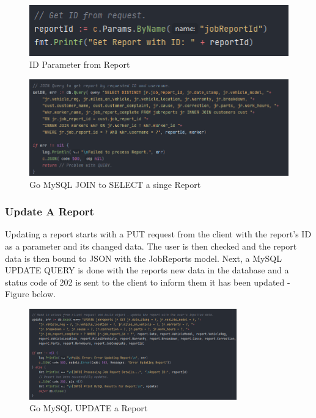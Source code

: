 \begin{figure}[H]
    \caption{ID Parameter from Report}
    \label{image:report_param_id}
    \centering
    \includegraphics[width=1.0\textwidth]{images/horton/report_system/get_report_id.png}
\end{figure}

\begin{figure}[H]
    \caption{Go MySQL JOIN to SELECT a singe Report}
    \label{image:report_by_id}
    \centering
    \includegraphics[width=1.0\textwidth]{images/horton/report_system/go_mysql_report_id.png}
\end{figure}

\subsubsection{Update A Report}
Updating a report starts with a PUT request from the client with the report's ID as a parameter and its changed data. The user is then checked and the report data is then bound to JSON with the JobReports model. Next, a MySQL UPDATE QUERY is done with the reports new data in the database and a status code of 202 is sent to the client to inform them it has been updated - Figure below.

\begin{figure}[H]
    \caption{Go MySQL UPDATE a Report}
    \label{image:updateReport}
    \centering
    \includegraphics[width=0.8\textwidth]{images/horton/report_system/update_report.png}
\end{figure}

